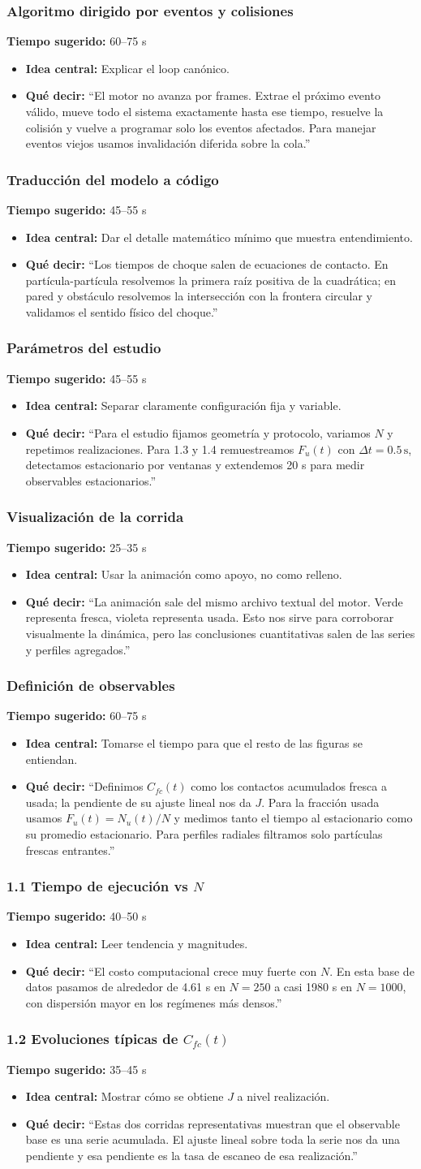 \documentclass[11pt]{article}
\newcommand{\slideguide}[4]{
  \subsubsection*{#1}
  \textbf{Tiempo sugerido:} #2
  \begin{itemize}
    \item \textbf{Idea central:} #3
    \item \textbf{Qu\'e decir:} #4
  \end{itemize}
}
\begin{document}
\slideguide{Algoritmo dirigido por eventos y colisiones}{60--75 s}{Explicar el loop can\'onico.}{``El motor no avanza por frames. Extrae el pr\'oximo evento v\'alido, mueve todo el sistema exactamente hasta ese tiempo, resuelve la colisi\'on y vuelve a programar solo los eventos afectados. Para manejar eventos viejos usamos invalidaci\'on diferida sobre la cola.''}

\slideguide{Traducci\'on del modelo a c\'odigo}{45--55 s}{Dar el detalle matem\'atico m\'inimo que muestra entendimiento.}{``Los tiempos de choque salen de ecuaciones de contacto. En part\'icula-part\'icula resolvemos la primera ra\'iz positiva de la cuadr\'atica; en pared y obst\'aculo resolvemos la intersecci\'on con la frontera circular y validamos el sentido f\'isico del choque.''}

\slideguide{Par\'ametros del estudio}{45--55 s}{Separar claramente configuraci\'on fija y variable.}{``Para el estudio fijamos geometr\'ia y protocolo, variamos $N$ y repetimos realizaciones. Para 1.3 y 1.4 remuestreamos $F_u(t)$ con $\Delta t = 0.5\,\mathrm{s}$, detectamos estacionario por ventanas y extendemos 20 s para medir observables estacionarios.''}

\slideguide{Visualizaci\'on de la corrida}{25--35 s}{Usar la animaci\'on como apoyo, no como relleno.}{``La animaci\'on sale del mismo archivo textual del motor. Verde representa fresca, violeta representa usada. Esto nos sirve para corroborar visualmente la din\'amica, pero las conclusiones cuantitativas salen de las series y perfiles agregados.''}

\slideguide{Definici\'on de observables}{60--75 s}{Tomarse el tiempo para que el resto de las figuras se entiendan.}{``Definimos $C_{fc}(t)$ como los contactos acumulados fresca a usada; la pendiente de su ajuste lineal nos da $J$. Para la fracci\'on usada usamos $F_u(t)=N_u(t)/N$ y medimos tanto el tiempo al estacionario como su promedio estacionario. Para perfiles radiales filtramos solo part\'iculas frescas entrantes.''}

\slideguide{1.1 Tiempo de ejecuci\'on vs $N$}{40--50 s}{Leer tendencia y magnitudes.}{``El costo computacional crece muy fuerte con $N$. En esta base de datos pasamos de alrededor de 4.61 s en $N=250$ a casi 1980 s en $N=1000$, con dispersi\'on mayor en los reg\'imenes m\'as densos.''}

\slideguide{1.2 Evoluciones t\'ipicas de $C_{fc}(t)$}{35--45 s}{Mostrar c\'omo se obtiene $J$ a nivel realizaci\'on.}{``Estas dos corridas representativas muestran que el observable base es una serie acumulada. El ajuste lineal sobre toda la serie nos da una pendiente y esa pendiente es la tasa de escaneo de esa realizaci\'on.''}
\end{document}
